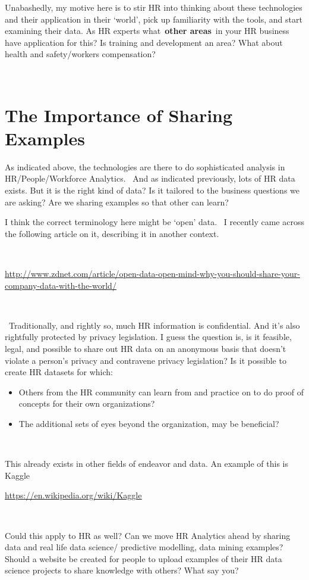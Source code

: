 \documentclass[
]{article}
\begin{document}
Unabashedly, my motive here is to stir HR into thinking about these
technologies and their application in their `world', pick up familiarity
with the tools, and start examining their data. As HR experts
what~\textbf{other areas}~in your HR business have application for this?
Is training and development an area? What about health and
safety/workers compensation?

~

\section{The Importance of Sharing
Examples}\label{the-importance-of-sharing-examples}

As indicated above, the technologies are there to do sophisticated
analysis in HR/People/Workforce Analytics. ~And as indicated previously,
lots of HR data exists. But it is the right kind of data? Is it tailored
to the business questions we are asking? Are we sharing examples so that
other can learn?

I think the correct terminology here might be `open' data.~ I recently
came across the following article on it, describing it in another
context.

~

\href{http://www.zdnet.com/article/open-data-open-mind-why-you-should-share-your-company-data-with-the-world/}{\ul{http://www.zdnet.com/article/open-data-open-mind-why-you-should-share-your-company-data-with-the-world/}}

~

~Traditionally, and rightly so, much HR information is confidential. And
it's also rightfully protected by privacy legislation. I guess the
question is, is it feasible, legal, and possible to share out HR data on
an anonymous basis that doesn't violate a person's privacy and
contravene privacy legislation? Is it possible to create HR datasets for
which:

\begin{itemize}
\item
  Others from the HR community can learn from and practice on to do
  proof of concepts for their own organizations?
\item
  The additional sets of eyes beyond the organization, may be
  beneficial?
\end{itemize}

~

This already exists in other fields of endeavor and data. An example of
this is Kaggle

\href{https://en.wikipedia.org/wiki/Kaggle}{\ul{https://en.wikipedia.org/wiki/Kaggle}}

~

Could this apply to HR as well? Can we move HR Analytics ahead by
sharing data and real life data science/ predictive modelling, data
mining examples? Should a website be created for people to upload
examples of their HR data science projects to share knowledge with
others? What say you?
\end{document}

